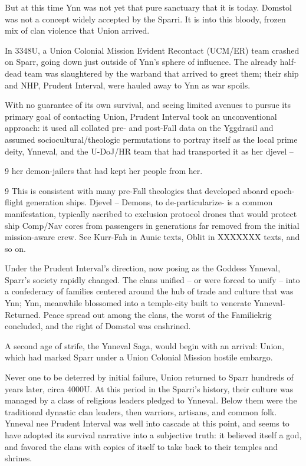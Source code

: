 But at this time Ynn was not yet that pure sanctuary that it is today. Domstol was not a concept  
widely accepted by the Sparri. It is into this bloody, frozen mix of clan violence that Union arrived.    

In 3348U, a Union Colonial Mission Evident Recontact (UCM/ER) team crashed on Sparr, going  
down just outside of Ynn’s sphere of influence. The already half-dead team was slaughtered by  
the warband that arrived to greet them; their ship and NHP, Prudent Interval, were hauled away to  
Ynn as war spoils.   

With no guarantee of its own survival, and seeing limited avenues to pursue its primary goal of  
contacting Union, Prudent Interval took an unconventional approach: it used all collated pre-  and  
post-Fall data on the Yggdrasil and assumed sociocultural/theologic permutations to portray itself  
as the local prime deity, Ynneval, and the U-DoJ/HR team that had transported it as her djevel --  

                      9 
her demon-jailers  that had kept her people from her.  

9 This is consistent with many pre-Fall theologies that developed aboard epoch-flight generation ships. Djevel --  
Demons, to de-particularize- is a common manifestation, typically ascribed to exclusion protocol drones that would  
protect ship Comp/Nav cores from passengers in generations far removed from the initial mission-aware crew. See  
Kurr-Fah in Aunic texts, Oblit in XXXXXXX texts, and so on.  

                                                                                                                      


Under the Prudent Interval’s direction, now posing as the Goddess Ynneval, Sparr’s society  
rapidly changed. The clans unified -- or were forced to unify -- into a confederacy of families  
centered around the hub of trade and culture that was Ynn; Ynn, meanwhile blossomed into a  
temple-city built to venerate Ynneval-Returned. Peace spread out among the clans, the worst of  
the Familiekrig concluded, and the right of Domstol was enshrined.   

A second age of strife, the Ynneval Saga, would begin with an arrival: Union, which had marked  
Sparr under a Union Colonial Mission hostile embargo.  

Never one to be deterred by initial failure, Union returned to Sparr hundreds of years later, circa  
4000U. At this period in the Sparri’s history, their culture was managed by a class of religious  
leaders pledged to Ynneval. Below them were the traditional dynastic clan leaders, then warriors,  
artisans, and common folk. Ynneval nee Prudent Interval was well into cascade at this point, and  
seems to have adopted its survival narrative into a subjective truth: it believed itself a god, and  
favored the clans with copies of itself to take back to their temples and shrines.   

